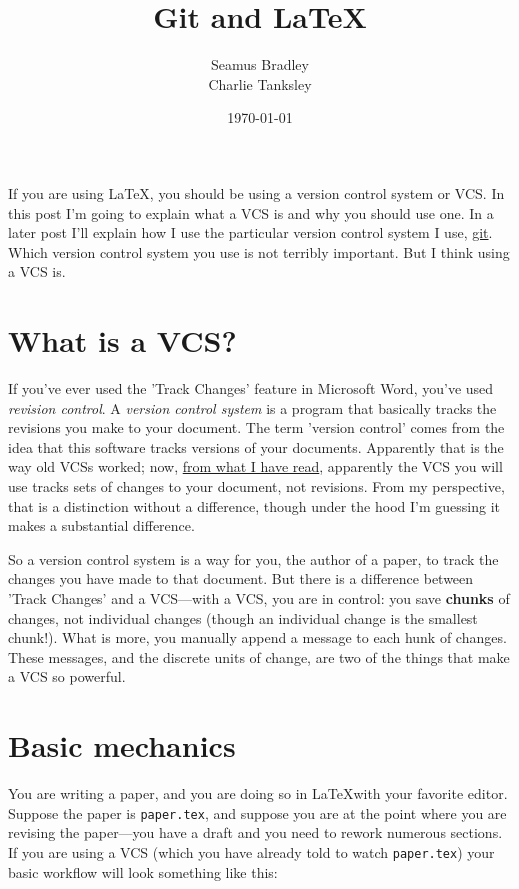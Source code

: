 \documentclass{article}
\title{Git and \LaTeX}
\author{Seamus Bradley\\Charlie Tanksley}
\date{\today}
\begin{document}
\lstset{language=[LaTeX]TeX,breaklines=true,frame=single,frameround=tttt}
  \maketitle
  \tableofcontents

If you are using \LaTeX, you should be using a version control system 
or VCS. In this post I'm going to explain what a VCS is and why you 
should use one. In a later post I'll explain how I use the particular 
version control system I use, \href{http://git-scm.com}{git}. Which 
version control system you use is not terribly important. But I think 
using a VCS is.

\section{What is a VCS?}

If you've ever used the 'Track Changes' feature in Microsoft Word, 
you've used \emph{revision control}. A \emph{version control system} 
is a program that basically tracks the revisions you make to your 
document. The term 'version control' comes from the idea that this 
software tracks versions of your documents. Apparently that is the way 
old VCSs worked; now, 
\href{http://www.joelonsoftware.com/items/2010/03/17.html}{from what I 
  have read}, apparently the VCS you will use tracks sets of changes 
to your document, not revisions. From my perspective, that is a 
distinction without a difference, though under the hood I'm guessing 
it makes a substantial difference.

So a version control system is a way for you, the author of a paper, 
to track the changes you have made to that document. But there is a 
difference between 'Track Changes' and a VCS—with a VCS, you are in 
control: you save \textbf{chunks} of changes, not individual changes 
(though an individual change is the smallest chunk!). What is more, 
you manually append a message to each hunk of changes. These messages, 
and the discrete units of change, are two of the things that make a 
VCS so powerful.

\section{Basic mechanics}

You are writing a paper, and you are doing so in \LaTeX with your 
favorite editor.  Suppose the paper is \verb!paper.tex!, and suppose 
you are at the point where you are revising the paper—you have a draft 
and you need to rework numerous sections. If you are using a VCS 
(which you have already told to watch \verb!paper.tex!) your basic 
workflow will look something like this:
\end{document}
